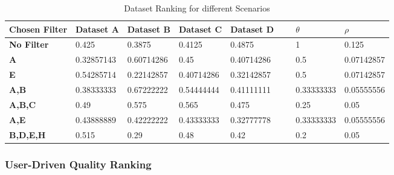 \begin{table}[tbph]
    \begin{tabular}{|l|l|l|l|l|l|l|l|}
    \hline
    \textbf{Chosen Filter} & \textbf{Dataset A}                                 & \textbf{Dataset B}                                 & \textbf{Dataset C}  & \textbf{Dataset D}                                  & ~ & $\theta$ & $\rho$ \\  \hline
     \textbf{No Filter}     & 0.425                                     & 0.3875                                    & 0.4125     &      \cellcolor{blue!25} 0.4875 & ~ & 1                   & 0.125             \\  \hline
     \textbf{A}             & 0.32857143                                & \cellcolor{blue!25} 0.60714286 & 0.45       & 0.40714286                                 & ~ & 0.5                 & 0.07142857        \\  \hline
    \textbf{E}             & \cellcolor{blue!25} 0.54285714 & 0.22142857                                & 0.40714286 & 0.32142857                                 & ~ & 0.5                 & 0.07142857        \\  \hline
     \textbf{A,B}           & 0.38333333                                & \cellcolor{blue!25} 0.67222222 & 0.54444444 & 0.41111111                                 & ~ & 0.33333333          & 0.05555556        \\  \hline
    \textbf{A,B,C}         & 0.49                                      & \cellcolor{blue!25} 0.575      & 0.565      & 0.475                                      & ~ & 0.25                & 0.05              \\  \hline
    \textbf{A,E}           & \cellcolor{blue!25} 0.43888889 & 0.42222222                                & 0.43333333 & 0.32777778                                 & ~ & 0.33333333          & 0.05555556        \\  \hline
    \textbf{B,D,E,H}       & \cellcolor{blue!25} 0.515      & 0.29                                      & 0.48       & 0.42                                       & ~ & 0.2                 & 0.05              \\  \hline
    \end{tabular}
    \label{tbl:dataset_ranking}
    \caption{Dataset Ranking for different Scenarios}
\end{table}

\subsubsection{User-Driven Quality Ranking}